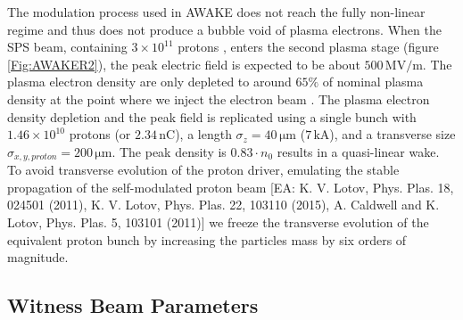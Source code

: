 \documentclass[aps,prstab,reprint,amsmath,amssymb,groupedaddress,onecolumn]{revtex4-1}
\newcommand{\unit}[1]{\,\mathrm{#1}}
\newcommand{\funit}[2]{\,\mathrm{#1}/\mathrm{#2}}
\newcommand{\nexp}[1]{\times 10^{#1}}
\begin{document}

The modulation process used in AWAKE does not reach the fully non-linear regime and thus does not produce a bubble void of plasma electrons. When
the SPS beam, containing $3\nexp{11}$ protons \cite{gschwendtner:2016}, enters the second plasma stage (figure \ref{Fig:AWAKER2}), the peak
electric field is expected to be about $500\funit{MV}{m}$. The plasma electron density are only depleted to around $65\%$ of
nominal plasma density at the point where we inject the electron beam \cite{awake_collaboration:2016}.  The plasma electron density depletion and the peak field is replicated using a single %
bunch with $1.46\nexp{10}$ protons (or $2.34\unit{nC}$), a %
length $\sigma_{z} = 40\unit{\mu m}$ ($7\unit{kA}$), and a transverse size $\sigma_{x,y,proton} = 200\unit{\mu m}$.   The peak density is $0.83\cdot n_{0}$ results in a quasi-linear wake. %
To avoid transverse evolution of the proton driver, emulating the stable propagation of the self-modulated proton beam [EA: K. V. Lotov, Phys. Plas. 18, 024501 (2011), K. V. Lotov, Phys. Plas. 22, 103110 (2015), A. Caldwell and K. Lotov, Phys. Plas. 5, 103101 (2011)] we freeze the transverse evolution of the equivalent proton bunch by increasing the particles mass by six orders of magnitude.

\subsection{Witness Beam Parameters}\label{S:M:Setup}
\end{document}
